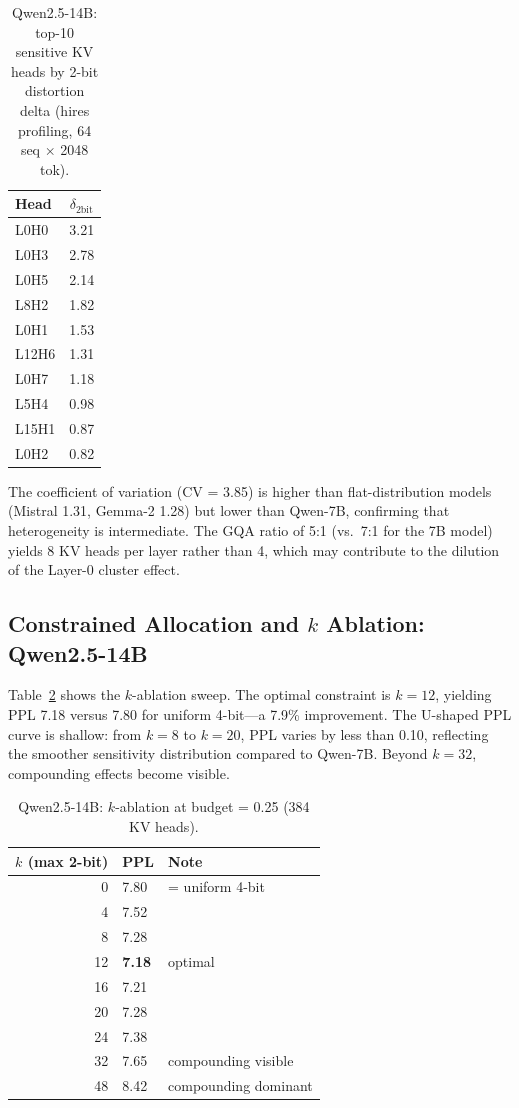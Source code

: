 \documentclass[11pt,a4paper]{article}
\begin{document}
\begin{table}[t]
\centering
\caption{Qwen2.5-14B: top-10 sensitive KV heads by 2-bit distortion delta (hires profiling, 64 seq $\times$ 2048 tok).}
\label{tab:14b_topheads}
\begin{tabular}{lc}
\toprule
Head & $\delta_{\text{2bit}}$ \\
\midrule
L0H0  & 3.21 \\
L0H3  & 2.78 \\
L0H5  & 2.14 \\
L8H2  & 1.82 \\
L0H1  & 1.53 \\
L12H6 & 1.31 \\
L0H7  & 1.18 \\
L5H4  & 0.98 \\
L15H1 & 0.87 \\
L0H2  & 0.82 \\
\bottomrule
\end{tabular}
\end{table}

The coefficient of variation (CV = 3.85) is higher than flat-distribution models (Mistral 1.31, Gemma-2 1.28) but lower than Qwen-7B, confirming that heterogeneity is intermediate.
The GQA ratio of 5:1 (vs.\ 7:1 for the 7B model) yields 8 KV heads per layer rather than 4, which may contribute to the dilution of the Layer-0 cluster effect.

\subsection{Constrained Allocation and $k$ Ablation: Qwen2.5-14B}
\label{sec:constrained_14b}

Table~\ref{tab:14b_k_ablation} shows the $k$-ablation sweep.
The optimal constraint is $k = 12$, yielding PPL 7.18 versus 7.80 for uniform 4-bit---a 7.9\% improvement.
The U-shaped PPL curve is shallow: from $k = 8$ to $k = 20$, PPL varies by less than 0.10, reflecting the smoother sensitivity distribution compared to Qwen-7B.
Beyond $k = 32$, compounding effects become visible.

\begin{table}[t]
\centering
\caption{Qwen2.5-14B: $k$-ablation at budget = 0.25 (384 KV heads).}
\label{tab:14b_k_ablation}
\begin{tabular}{rll}
\toprule
$k$ (max 2-bit) & PPL & Note \\
\midrule
0  & 7.80 & = uniform 4-bit \\
4  & 7.52 & \\
8  & 7.28 & \\
12 & \textbf{7.18} & optimal \\
16 & 7.21 & \\
20 & 7.28 & \\
24 & 7.38 & \\
32 & 7.65 & compounding visible \\
48 & 8.42 & compounding dominant \\
\bottomrule
\end{tabular}
\end{table}
\end{document}
